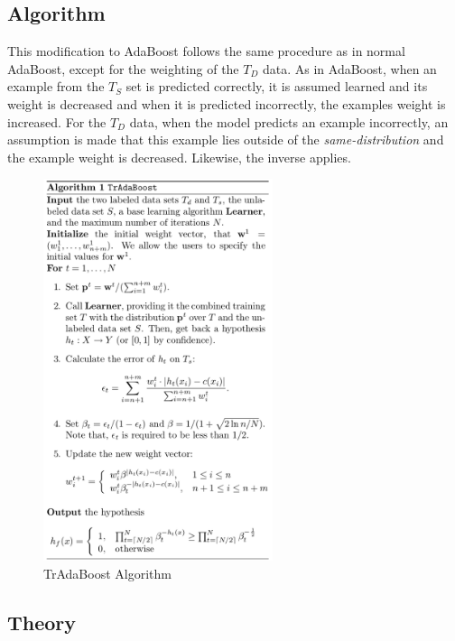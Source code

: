 \documentclass[12pt]{article}
\begin{document}
      \subsection{Algorithm} \label{boost-tradaboost-algo}

        This modification to AdaBoost follows the same procedure as in normal AdaBoost, except for the weighting of the $T_D$ data. As in
        AdaBoost, when an example from the $T_S$ set is predicted correctly, it is assumed learned and its weight is decreased and when it
        is predicted incorrectly, the examples weight is increased. For the $T_D$ data, when the model predicts an example incorrectly,
        an assumption is made that this example lies outside of the {\it same-distribution} and the example weight is decreased. Likewise,
        the inverse applies.

        \begin{figure}[H]
          \centering
          \includegraphics[width=0.6\textwidth]{tradaboost-algorithm.png}
          \caption{TrAdaBoost Algorithm \autocite{dai_yang_xue_yu_2007}}
          \label{tradaboost-algorithm}
        \end{figure}

      \subsection{Theory} \label{boost-tradaboost-theory}
\end{document}
